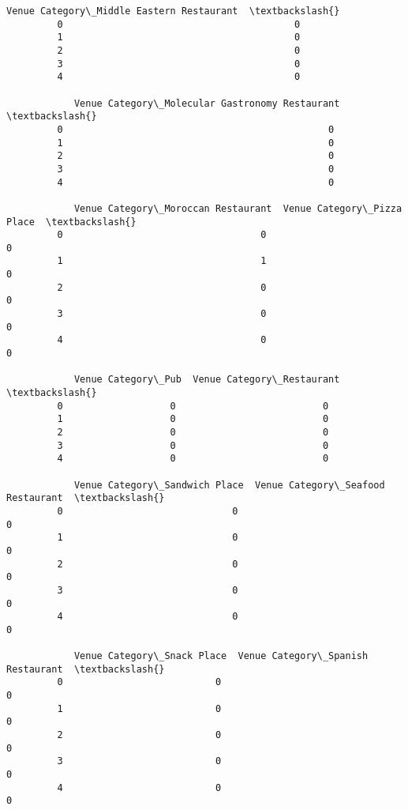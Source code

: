 \documentclass[11pt]{article}
\begin{document}
\begin{Verbatim}[commandchars=\\\{\}]
            Venue Category\_Middle Eastern Restaurant  \textbackslash{}
         0                                         0   
         1                                         0   
         2                                         0   
         3                                         0   
         4                                         0   
         
            Venue Category\_Molecular Gastronomy Restaurant  \textbackslash{}
         0                                               0   
         1                                               0   
         2                                               0   
         3                                               0   
         4                                               0   
         
            Venue Category\_Moroccan Restaurant  Venue Category\_Pizza Place  \textbackslash{}
         0                                   0                           0   
         1                                   1                           0   
         2                                   0                           0   
         3                                   0                           0   
         4                                   0                           0   
         
            Venue Category\_Pub  Venue Category\_Restaurant  \textbackslash{}
         0                   0                          0   
         1                   0                          0   
         2                   0                          0   
         3                   0                          0   
         4                   0                          0   
         
            Venue Category\_Sandwich Place  Venue Category\_Seafood Restaurant  \textbackslash{}
         0                              0                                  0   
         1                              0                                  0   
         2                              0                                  0   
         3                              0                                  0   
         4                              0                                  0   
         
            Venue Category\_Snack Place  Venue Category\_Spanish Restaurant  \textbackslash{}
         0                           0                                  0   
         1                           0                                  0   
         2                           0                                  0   
         3                           0                                  0   
         4                           0                                  0   
         

\end{Verbatim}
\end{document}
